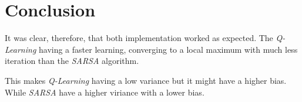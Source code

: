 \documentclass[journal]{IEEEtran}
\begin{document}
\section {Conclusion}

It was clear, therefore, that both implementation worked as expected. The \textit{Q-Learning} having a faster learning, converging to a local maximum with much less iteration than the \textit{SARSA} algorithm.

This makes \textit{Q-Learning} having a low variance but it might have a higher bias. While \textit{SARSA} have a higher viriance with a lower bias.

\vfill
\end{document}

